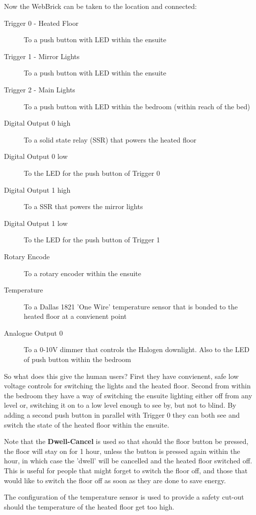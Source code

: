 Now the WebBrick can be taken to the location and connected:

\begin{description}
\item[Trigger 0 - Heated Floor]  To a push button with LED within the ensuite
\item[Trigger 1 - Mirror Lights] To a push button with LED within the ensuite
\item[Trigger 2 - Main Lights]  To a push button with LED within the bedroom (within reach of the bed)
\item[Digital Output 0 high] To a solid state relay (SSR) that powers the heated floor
\item[Digital Output 0 low] To the LED for the push button of Trigger 0
\item[Digital Output 1 high] To a SSR that powers the mirror lights
\item[Digital Output 1 low] To the LED for the push button of Trigger 1
\item[Rotary Encode]  To a rotary encoder within the ensuite
\item[Temperature]  To a Dallas 1821 'One Wire' temperature sensor that is bonded to the heated floor at a convienent point
\item[Analogue Output 0] To a 0-10V dimmer that controls the Halogen downlight. Also to the LED of push button within the bedroom
\end{description}

So what does this give the human users?  First they have convienent, safe low voltage controls for switching the lights and the heated floor.
Second from within the bedroom they have a way of switching the ensuite lighting either off from any level or, switching it on to a low level
enough to see by, but not to blind.  By adding a second push button in parallel with Trigger 0 they can both see and switch the state of the
heated floor within the ensuite.

Note that the \textbf{Dwell-Cancel} is used so that should the floor button be pressed, the floor will stay on for 1 hour, unless the button is pressed
again within the hour, in which case the 'dwell' will be cancelled and the heated floor switched off.  This is useful for people that might forget
to switch the floor off, and those that would like to switch the floor off as soon as they are done to save energy.

The configuration of the temperature sensor is used to provide a safety cut-out should the temperature of the heated floor get too high.

